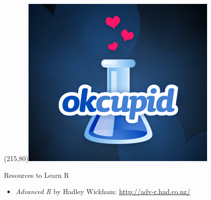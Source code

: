 \begin{frame}
\Put(215,80){\includegraphics[scale=.15]{../common/pics/R_using_logos/okcupid}}
\end{frame}





\begin{frame}
  \begin{block}{Resources to Learn R}\pause
  \begin{itemize}[<+-|alert@+>]
    \item \emph{Advanced R} by Hadley Wickham: \url{http://adv-r.had.co.nz/}
  \end{itemize}
\end{block}
\end{frame}